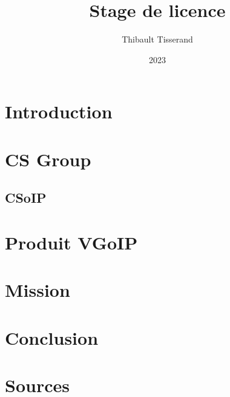 \documentclass{beamer}
\title{Stage de licence}
\author{Thibault Tisserand}
\institute{Université de Lille}
\date{2023}
\begin{document}
\titlepage



\section{Introduction}


\section{CS Group}


\subsection{CSoIP}


\section{Produit VGoIP}


\section{Mission}


\section{Conclusion}


\section{Sources}

\end{document}
